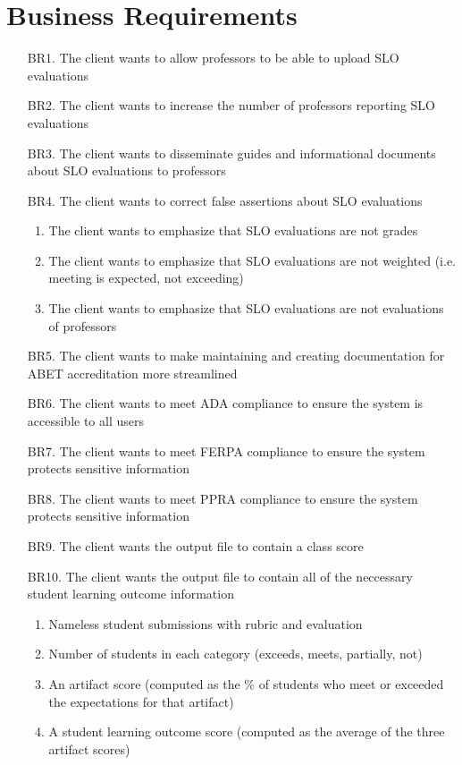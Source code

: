 \documentclass[a4paper,12pt]{article}
\begin{document}
\section*{Business Requirements}
\begin{enumerate}
\item [BR1.] The client wants to allow professors to be able to upload SLO evaluations
\item [BR2.] The client wants to increase the number of professors reporting SLO evaluations
\item [BR3.] The client wants to disseminate guides and informational documents about SLO evaluations to professors
\item [BR4.] The client wants to correct false assertions about SLO evaluations 
	\begin{enumerate}
	\item The client wants to emphasize that SLO evaluations are not grades
	\item The client wants to emphasize that SLO evaluations are not weighted (i.e. meeting is expected, not exceeding)
	\item The client wants to emphasize that SLO evaluations are not evaluations of professors
	\end{enumerate}
\item [BR5.] The client wants to make maintaining and creating documentation for ABET accreditation more streamlined
\item [BR6.] The client wants to meet ADA compliance to ensure the system is accessible to all users
\item [BR7.] The client wants to meet FERPA compliance to ensure the system protects sensitive information
\item [BR8.] The client wants to meet PPRA compliance to ensure the system protects sensitive information
\item [BR9.] The client wants the output file to contain a class score
\item [BR10.] The client wants the output file to contain all of the neccessary student learning outcome information
	\begin{enumerate}
		\item Nameless student submissions with rubric and evaluation
		\item Number of students in each category (exceeds, meets, partially, not)
		\item An artifact score (computed as the \% of students who meet or exceeded the expectations for that artifact)
		\item A student learning outcome score (computed as the average of the three artifact scores)
	\end{enumerate}
\end{enumerate}
\end{document}
